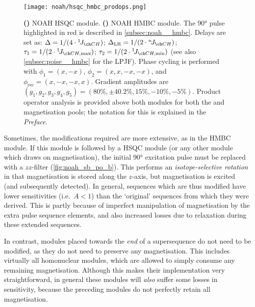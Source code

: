 \begin{figure}[htb]
    \centering
    \texttt{[image: noah/hsqc\_hmbc\_prodops.png]}%
    {\label{fig:noah_sb_po_s}}%
    {\label{fig:noah_sb_po_b}}%
    \caption[NOAH HSQC and HMBC modules with product operator analysis]{
        \textbf{()} 
        NOAH HSQC module.
        \textbf{()} 
        NOAH HMBC module.
        The \ang{90} pulse highlighted in red is described in \cref{subsec:noah__hmbc}.
        Delays are set as: $\Delta = 1 / (4 \cdot \oneJ{CH})$; $\Delta_\text{LR} = 1 / (2 \cdot \nJ{CH})$; $\tau_1 = 1 / (2 \cdot \oneJ{CH,\text{max}})$; $\tau_2 = 1 / (2 \cdot \oneJ{CH,\text{min}})$ (see also \cref{subsec:poise__hmbc} for the LPJF).
        Phase cycling is performed with $\phi_1 = (x, -x)$, $\phi_2 = (x, x, -x, -x)$, and $\phi_\text{rec} = (x, -x, -x, x)$.
        Gradient amplitudes are $(g_1, g_2, g_3, g_4, g_5) = (80\%, \pm 40.2\%, 15\%, -10\%, -5\%)$.
        Product operator analysis is provided above both modules for both the  and  magnetisation pools; the notation for this is explained in the \textit{Preface}.
    }
    \label{fig:noah_sb_po}
\end{figure}

Sometimes, the modifications required are more extensive, as in the HMBC module.
If this module is followed by a HSQC module (or any other module which draws on  magnetisation), the initial \ang{90} excitation pulse must be replaced with a $zz$-filter (\cref{fig:noah_sb_po_b}).
This performs an \textit{isotope-selective rotation} in that  magnetisation is stored along the $z$-axis, but  magnetisation is excited (and subsequently detected).
In general, sequences which are thus modified have lower sensitivities (i.e.\ $A < 1$) than the `original' sequences from which they were derived.
This is partly because of imperfect manipulation of magnetisation by the extra pulse sequence elements, and also increased losses due to relaxation during these extended sequences.

In contrast, modules placed towards the \textit{end} of a supersequence do not need to be modified, as they do not need to preserve any magnetisation.
This includes virtually all homonuclear modules, which are allowed to simply consume any remaining magnetisation.
Although this makes their implementation very straightforward, in general these modules will \textit{also} suffer some losses in sensitivity, because the preceding modules do not perfectly retain all magnetisation.

